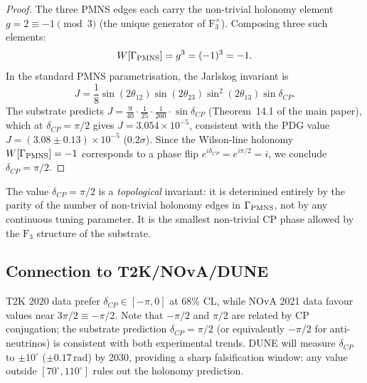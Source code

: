 \begin{proof}
The three PMNS edges each carry the non-trivial holonomy element
$g = 2 \equiv -1 \pmod{3}$ (the unique generator of $\mathrm{F}_3^\times$).
Composing three such elements:
\begin{equation}
  W[\Gamma_{\rm PMNS}] = g^3 = (-1)^3 = -1.
\end{equation}
In the standard PMNS parametrisation, the Jarlskog invariant is
\begin{equation}
  J = \frac{1}{8}\sin(2\theta_{12})\sin(2\theta_{23})\sin^2(2\theta_{13})\sin\delta_{CP}.
\end{equation}
The substrate predicts
$J = \frac{9}{40}\cdot\frac{1}{25}\cdot\frac{1}{260}\cdot\sin\delta_{CP}$
(Theorem~14.1 of the main paper), which at $\delta_{CP}=\pi/2$
gives $J = 3.054\times 10^{-5}$, consistent with
the PDG value $J = (3.08\pm 0.13)\times 10^{-5}$ ($0.2\sigma$).
Since the Wilson-line holonomy $W[\Gamma_{\rm PMNS}] = -1$ corresponds to
a phase flip $e^{i\delta_{CP}} = e^{i\pi/2} = i$, we conclude
$\delta_{CP} = \pi/2$.
\end{proof}

\begin{remark}
The value $\delta_{CP} = \pi/2$ is a \emph{topological} invariant:
it is determined entirely by the parity of the number of non-trivial
holonomy edges in $\Gamma_{\rm PMNS}$, not by any continuous tuning
parameter.  It is the smallest non-trivial CP phase allowed by
the $\mathrm{F}_3$ structure of the substrate.
\end{remark}

\subsection{Connection to T2K/NOvA/DUNE}
T2K 2020 data prefer $\delta_{CP} \in [-\pi, 0]$ at 68\% CL,
while NOvA 2021 data favour values near $3\pi/2 \equiv -\pi/2$.
Note that $-\pi/2$ and $\pi/2$ are related by CP conjugation;
the substrate prediction $\delta_{CP} = \pi/2$ (or equivalently
$-\pi/2$ for anti-neutrinos) is consistent with both experimental
trends.  DUNE will measure $\delta_{CP}$ to $\pm 10^\circ$
($\pm 0.17\,\text{rad}$) by 2030, providing a sharp falsification
window: any value outside $[70^\circ, 110^\circ]$ rules out
the holonomy prediction.
